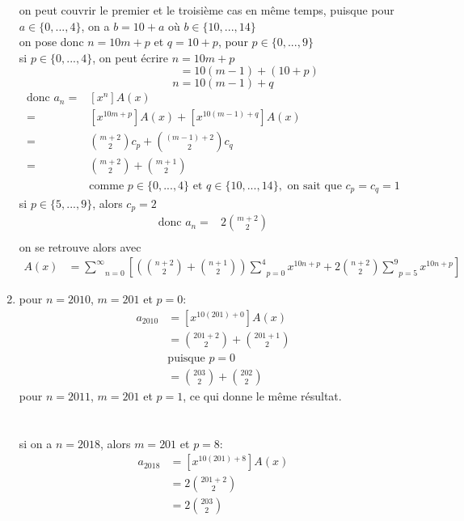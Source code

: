 \documentclass[fontsize=10pt]{article}
\begin{document}
\begin{enumerate}
on peut couvrir le premier et le troisième cas en même temps, puisque pour $a \in \{0,...,4\}$, on a $b = 10 +a$ où $b \in \{10,...,14\}$\\
\newpage
on pose donc $n= 10m + p$ et $q = 10+p$, pour $p \in \{0,...,9\}$\\
si $p \in \{0,...,4\}$, on peut écrire $n=10m+p$\\
$\phantom{aaaaaaaaaaaaaaaaaaaaaaaaaln}=10(m-1) + (10+p)$\\
$\phantom{aaaaaaaaaaaaaaaaaaaaaaaaal} n=10(m-1) + q$
\begin{align*}
\text{donc } a_n =& [x^n] A(x)\\
=& [x^{10m+p}]A(x) + [x^{10(m-1)+q}]A(x)\\
=& {m+2 \choose 2}c_p + {(m-1)+2 \choose 2}c_q\\
=& {m+2 \choose 2} + {m+1 \choose 2}\\
&\text{comme } p \in \{0,...,4\} \text{ et } q \in \{10,...,14\}, \text{ on sait que } c_p = c_q = 1
\end{align*}
si $p \in \{5,...,9\}$, alors $c_p = 2$
\begin{align*}
\text{donc } a_n =& 2 {m+2 \choose 2}\\
\end{align*}
on se retrouve alors avec
\begin{align*}
A(x) &= \underset{n=0}{\overset{\infty}{\sum}} \left[ \left({n+2 \choose 2} + {n+1 \choose 2}\right) \underset{p=0}{\overset{4}{\sum}} x^{10n +p} + 2 {n+2 \choose 2} \underset{p=5}{\overset{9}{\sum}} x^{10n + p} \right]
\end{align*}
\item
pour $n=2010$, $m=201$ et $p=0$:\\
\begin{align*}
a_{2010} &= \left[x^{10(201)+0}\right]A(x)\\
&= {201+2 \choose 2} + {201+1 \choose 2}\\
&\text{puisque } p=0\\
&= {203 \choose 2} + {202 \choose 2}
\end{align*}
pour $n=2011$, $m=201$ et $p=1$, ce qui donne le même résultat.\\\\\\
si on a $n=2018$, alors $m=201$ et $p=8$:\\
\begin{align*}
a_{2018} &= \left[x^{10(201)+8}\right]A(x)\\
&= 2 {201+2 \choose 2}\\
&= 2{203 \choose 2}
\end{align*}
\end{enumerate}
\end{document}
